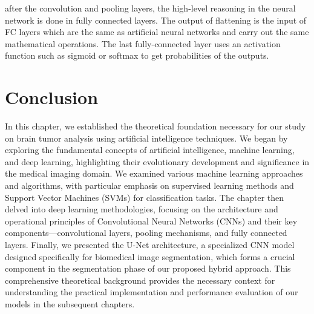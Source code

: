 after the convolution and pooling layers, the high-level reasoning in the neural network is done in fully connected layers. The output of flattening is the input of FC layers which are the same as artificial neural networks and carry out the same mathematical operations. The last fully-connected layer uses an activation function such as sigmoid or softmax to get probabilities of the outputs.



\section{Conclusion}
\label{sec:conclusion}

In this chapter, we established the theoretical foundation necessary for our study on brain tumor analysis using artificial intelligence techniques. We began by exploring the fundamental concepts of artificial intelligence, machine learning, and deep learning, highlighting their evolutionary development and significance in the medical imaging domain. We examined various machine learning approaches and algorithms, with particular emphasis on supervised learning methods and Support Vector Machines (SVMs) for classification tasks. The chapter then delved into deep learning methodologies, focusing on the architecture and operational principles of Convolutional Neural Networks (CNNs) and their key components—convolutional layers, pooling mechanisms, and fully connected layers. Finally, we presented the U-Net architecture, a specialized CNN model designed specifically for biomedical image segmentation, which forms a crucial component in the segmentation phase of our proposed hybrid approach. This comprehensive theoretical background provides the necessary context for understanding the practical implementation and performance evaluation of our models in the subsequent chapters.
